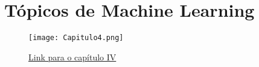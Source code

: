 \documentclass{beamer}
\begin{document}
\section{Tópicos de Machine Learning}

\begin{frame}

    \begin{figure}[ht]
        \centering
        \texttt{[image: Capitulo4.png]}
        \caption{\href{run:./capitulos/Capitulo_04/Capitulo04.pdf}{Link para o capítulo IV}}
    \end{figure}

\end{frame}
\end{document}
